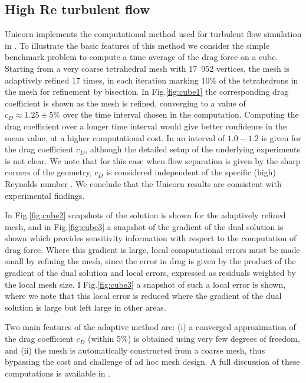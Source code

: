\subsection{High Re turbulent flow}

Unicorn implements the computational method used for turbulent flow simulation in \cite{Hoffman2005,HoffmanJohnson2006b,Hoffman2006,Hoffman2009,HoffmanJansson2009,VilelaJanssonEtAl2010}. 
To illustrate the basic features of this method we consider the simple benchmark problem to compute a time average of the drag force on a cube. Starting from a very coarse tetrahedral mesh with 17~952 vertices, the mesh is adaptively refined 17 times, in each iteration marking 10\% of the tetrahedrons in the mesh for refinement by bisection. In Fig.\ref{fig:cube1} the corresponding drag coefficient is shown as the mesh is refined, converging to a value of $c_D\approx 1.25\pm 5\%$ over the time interval chosen in the computation. Computing the drag coefficient over a longer time interval would give better confidence in the mean value, at a higher computational cost. In \cite{Mccormick1995} an interval of $1.0-1.2$ is given for the drag coefficient $c_D$, although the detailed setup of the underlying experiments is not clear. We note that for this case when flow separation is given by the sharp corners of the geometry, $c_D$ is considered independent of the specific (high) Reynolds number \cite{Mccormick1995}. 
We conclude that the Unicorn results are consistent with experimental findings.  

In Fig.\ref{fig:cube2} snapshots of the solution is shown for the adaptively refined mesh, and in 
Fig.\ref{fig:cube3} a snapshot of the gradient of the dual solution is shown which provides sensitivity information with respect to the computation of drag force. Where this gradient is large, local computational errors must be made small by refining the mesh, since the error in drag is given by the product of the gradient of the dual solution and local errors, expressed as residuals weighted by the local mesh size. I Fig.\ref{fig:cube3} a snapshot of such a local error is shown, where we note that this local error is reduced where the gradient of the dual solution is large but left large in other areas.  

Two main features of the adaptive method are: (i) a converged approximation of the drag coefficient $c_D$ (within 5\%) is obtained using very few degrees of freedom, and (ii) the mesh is automatically constructed from a coarse mesh, thus bypassing the cost and challenge of ad hoc mesh design. A full discussion of these computations is available in \cite{HoffmanJansson2011}.


